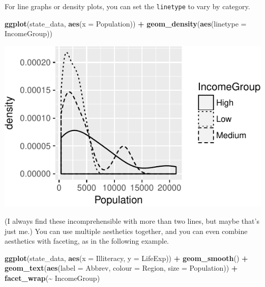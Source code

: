 \documentclass[
  12pt,
  oneside,openany]{book}
\newenvironment{Shaded}{\begin{snugshade}}{\end{snugshade}}
\newcommand{\DataTypeTok}[1]{\textcolor[rgb]{0.13,0.29,0.53}{#1}}
\newcommand{\KeywordTok}[1]{\textcolor[rgb]{0.13,0.29,0.53}{\textbf{#1}}}
\newcommand{\NormalTok}[1]{#1}
\newcommand{\OperatorTok}[1]{\textcolor[rgb]{0.81,0.36,0.00}{\textbf{#1}}}
\newcommand{\StringTok}[1]{\textcolor[rgb]{0.31,0.60,0.02}{#1}}
\begin{document}
For line graphs or density plots, you can set the \texttt{linetype} to vary by category.

\begin{Shaded}
\begin{Highlighting}[]
\KeywordTok{ggplot}\NormalTok{(state\_data, }\KeywordTok{aes}\NormalTok{(}\DataTypeTok{x =}\NormalTok{ Population)) }\OperatorTok{+}
\StringTok{  }\KeywordTok{geom\_density}\NormalTok{(}\KeywordTok{aes}\NormalTok{(}\DataTypeTok{linetype =}\NormalTok{ IncomeGroup))}
\end{Highlighting}
\end{Shaded}

\includegraphics{pdaps_files/figure-latex/aes-linetype-1.pdf}

(I always find these incomprehensible with more than two lines, but maybe that's just me.) You can use multiple aesthetics together, and you can even combine aesthetics with faceting, as in the following example.

\begin{Shaded}
\begin{Highlighting}[]
\KeywordTok{ggplot}\NormalTok{(state\_data, }\KeywordTok{aes}\NormalTok{(}\DataTypeTok{x =}\NormalTok{ Illiteracy, }\DataTypeTok{y =}\NormalTok{ LifeExp)) }\OperatorTok{+}
\StringTok{  }\KeywordTok{geom\_smooth}\NormalTok{() }\OperatorTok{+}
\StringTok{  }\KeywordTok{geom\_text}\NormalTok{(}\KeywordTok{aes}\NormalTok{(}\DataTypeTok{label =}\NormalTok{ Abbrev, }\DataTypeTok{colour =}\NormalTok{ Region, }\DataTypeTok{size =}\NormalTok{ Population)) }\OperatorTok{+}
\StringTok{  }\KeywordTok{facet\_wrap}\NormalTok{(}\OperatorTok{\textasciitilde{}}\StringTok{ }\NormalTok{IncomeGroup)}
\end{Highlighting}
\end{Shaded}
\end{document}
